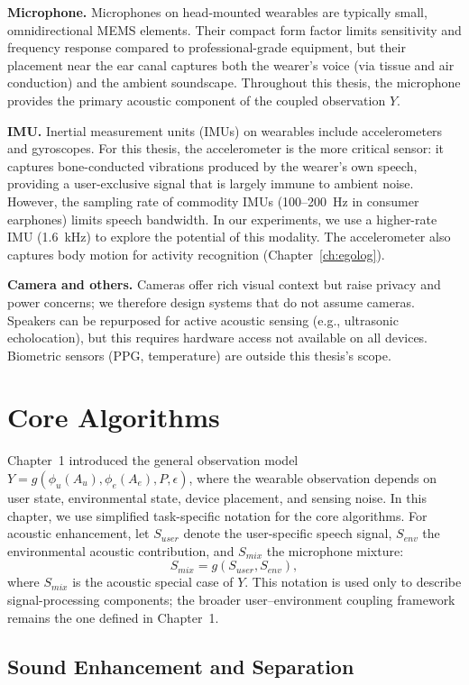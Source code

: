 \noindent\textbf{Microphone.}
Microphones on head-mounted wearables are typically small, omnidirectional MEMS elements. Their compact form factor limits sensitivity and frequency response compared to professional-grade equipment, but their placement near the ear canal captures both the wearer's voice (via tissue and air conduction) and the ambient soundscape. Throughout this thesis, the microphone provides the primary acoustic component of the coupled observation $Y$.

\noindent\textbf{IMU.}
Inertial measurement units (IMUs) on wearables include accelerometers and gyroscopes. For this thesis, the accelerometer is the more critical sensor: it captures bone-conducted vibrations produced by the wearer's own speech, providing a user-exclusive signal that is largely immune to ambient noise. However, the sampling rate of commodity IMUs (100--200~Hz in consumer earphones) limits speech bandwidth. In our experiments, we use a higher-rate IMU (1.6~kHz) to explore the potential of this modality. The accelerometer also captures body motion for activity recognition (Chapter~\ref{ch:egolog}).

\noindent\textbf{Camera and others.}
Cameras offer rich visual context but raise privacy and power concerns; we therefore design systems that do not assume cameras. Speakers can be repurposed for active acoustic sensing (e.g., ultrasonic echolocation), but this requires hardware access not available on all devices. Biometric sensors (PPG, temperature) are outside this thesis's scope.

\section{Core Algorithms}

Chapter~1 introduced the general observation model $Y = g(\phi_u(A_u), \phi_e(A_e), P, \epsilon)$, where the wearable observation depends on user state, environmental state, device placement, and sensing noise. In this chapter, we use simplified task-specific notation for the core algorithms. For acoustic enhancement, let $S_{user}$ denote the user-specific speech signal, $S_{env}$ the environmental acoustic contribution, and $S_{mix}$ the microphone mixture:
\[
S_{mix} = g(S_{user}, S_{env}),
\]
where $S_{mix}$ is the acoustic special case of $Y$. This notation is used only to describe signal-processing components; the broader user--environment coupling framework remains the one defined in Chapter~1.

\subsection{Sound Enhancement and Separation}

